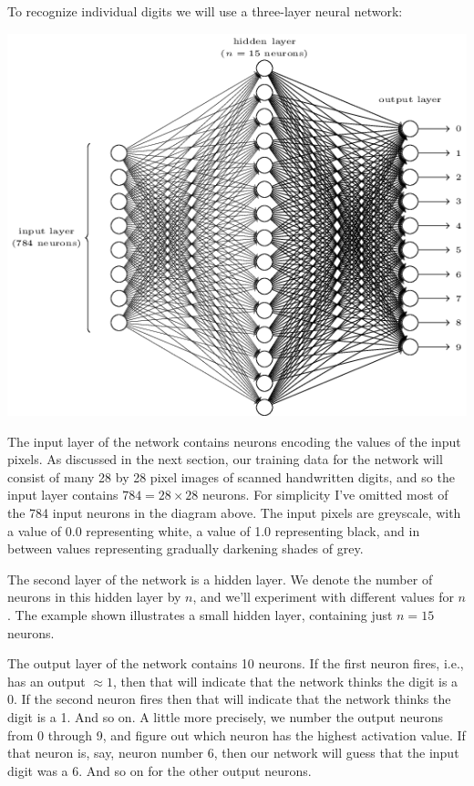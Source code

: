 \documentclass[a4paper,twoside,10pt]{book}
\begin{document}
To recognize individual digits we will use a three-layer neural network:
\begin{center}
	\includegraphics[width=\linewidth]{./figures/ch1/tikz12}
\end{center}
The input layer of the network contains neurons encoding the values of the input pixels. As discussed in the next section, our training data for the network will consist of many 28 by 28 pixel images of scanned handwritten digits, and so the input layer contains $784=28\times28$ neurons. For simplicity I've omitted most of the 784 input neurons in the diagram above. The input pixels are greyscale, with a value of 0.0 representing white, a value of 1.0 representing black, and in between values representing gradually darkening shades of grey.

The second layer of the network is a hidden layer. We denote the number of neurons in this hidden layer by $n$, and we'll experiment with different values for $n$. The example shown illustrates a small hidden layer, containing just $n=15$ neurons.

The output layer of the network contains 10 neurons. If the first neuron fires, i.e., has an output $\approx 1$, then that will indicate that the network thinks the digit is a 0. If the second neuron fires then that will indicate that the network thinks the digit is a 1. And so on. A little more precisely, we number the output neurons from 0 through 9, and figure out which neuron has the highest activation value. If that neuron is, say, neuron number 6, then our network will guess that the input digit was a 6. And so on for the other output neurons.
\end{document}

